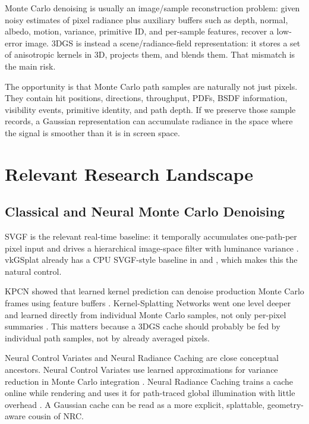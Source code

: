 \documentclass[11pt]{article}
\begin{document}
Monte Carlo denoising is usually an image/sample reconstruction problem:
given noisy estimates of pixel radiance plus auxiliary buffers such as depth,
normal, albedo, motion, variance, primitive ID, and per-sample features, recover
a low-error image. 3DGS is instead a scene/radiance-field representation:
it stores a set of anisotropic kernels in 3D, projects them, and blends them.
That mismatch is the main risk.

The opportunity is that Monte Carlo path samples are naturally not just pixels.
They contain hit positions, directions, throughput, PDFs, BSDF information,
visibility events, primitive identity, and path depth. If we preserve those
sample records, a Gaussian representation can accumulate radiance in the space
where the signal is smoother than it is in screen space.

\section{Relevant Research Landscape}

\subsection{Classical and Neural Monte Carlo Denoising}

SVGF is the relevant real-time baseline: it temporally accumulates one-path-per
pixel input and drives a hierarchical image-space filter with luminance variance
\cite{schied2017svgf}. vkGSplat already has a CPU SVGF-style baseline in
 and , which makes
this the natural control.

KPCN showed that learned kernel prediction can denoise production Monte Carlo
frames using feature buffers \cite{bako2017kpcn}. Kernel-Splatting Networks
went one level deeper and learned directly from individual Monte Carlo samples,
not only per-pixel summaries \cite{gharbi2019ksn}. This matters because a 3DGS
cache should probably be fed by individual path samples, not by already averaged
pixels.

Neural Control Variates and Neural Radiance Caching are close conceptual
ancestors. Neural Control Variates use learned approximations for variance
reduction in Monte Carlo integration \cite{muller2020ncv}. Neural Radiance
Caching trains a cache online while rendering and uses it for path-traced
global illumination with little overhead \cite{muller2021nrc}. A Gaussian cache
can be read as a more explicit, splattable, geometry-aware cousin of NRC.
\end{document}
